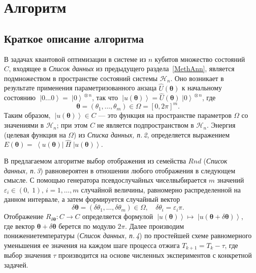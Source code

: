 \documentclass[a4paper]{report}
\newcommand{\ket}[1] {\!\!\;\ensuremath{\left|#1\right\rangle}}
\newcommand{\bra}[1] {\!\!\:\ensuremath{\left\langle#1\right|\!\!\:}}
\begin{document}
\section{Алгоритм}

\subsection{Краткое описание алгоритма}

В задачах квантовой оптимизации в системе из $n$ кубитов множество состояний $C$, входящее в \textit{Список данных} из предыдущего раздела~\ref{MethAnn}, является подмножеством в пространстве состояний системы ${\mathcal{H}_n}$. Оно возникает в результате применения параметризованного анзаца ${\hat{U}(\bm\theta)}$ к начальному состоянию ${\ket{0\ldots0}=\ket0^{\!{\scriptscriptstyle\otimes}{n}}}$, так что ${\ket{u(\bm\theta)}= \hat{U}(\bm\theta)\ket0^{\!{\scriptscriptstyle\otimes}{n}}}$, где
\begin{equation*}
\bm\theta= (\theta_1,\ldots,\theta_m)\in\Omega= [0, 2\pi]^m.
\end{equation*}
Таким образом, ${\ket{u(\bm\theta)}}\in C$ --- это функция на пространстве параметров $\Omega$ со значениями в ${\mathcal{H}_n}$; при этом $C$ не является подпространством в ${\mathcal{H}_n}$. Энергия (целевая функция на $\Omega$) из \textit{Списка данных, п.\,2}, определяется выражением $E(\bm\theta)= \bra{u(\bm\theta)}\hat{H}\ket{u(\bm\theta)}$.

В предлагаемом алгоритме выбор отображения из семейства $Rnd$ (\textit{Список данных, п.\,3}) равновероятен в отношении любого отображения в следующем смысле.
С помощью генератора псевдослучайных чисел\linebreak выбирается $m$ значений ${\varepsilon_i\in(0,\;1),\, i=1,\ldots,m}$ случайной величины, равномерно распределенной на данном интервале, а затем формируется случайный вектор
\begin{equation*}
\delta\bm\theta=(\delta\theta_1,\ldots,\delta\theta_m)\in\Omega,\quad \delta\theta_i= \varepsilon_i\pi.
\end{equation*}
Отображение $R_{\delta\bm\theta}\!: C\rightarrow C$ определяется формулой ${\ket{u(\bm\theta)} \mapsto \ket{u(\bm\theta\!+\!\delta\bm\theta)}}$, где вектор ${\bm\theta+\delta\bm\theta}$ берется по модулю $2\pi$. Далее производим понижение\linebreak температуры (\textit{Список данных, п.\,4}) по простейшей схеме равномерного уменьшения ее значения на каждом шаге процесса отжига $T_{k+1}\!=T_k-\tau$, где выбор значения $\tau$ производится на основе численных экспериментов с конкретной задачей.
\end{document}

